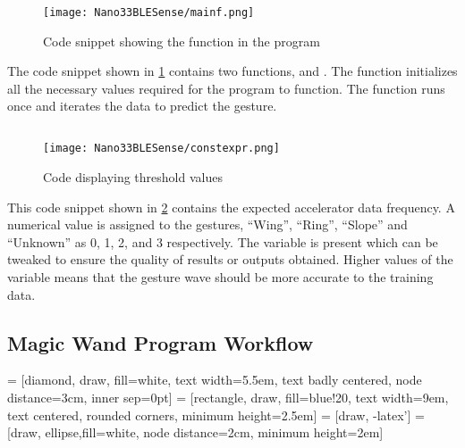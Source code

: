 \begin{figure}[h!]
    \texttt{[image: Nano33BLESense/mainf.png]}
    \caption{Code snippet showing the function  in the program}
    \label{mainf}
\end{figure}

The code snippet shown in \ref{mainf} contains two functions,  and . The function  initializes all the necessary values required for the program to function. The function   runs once and iterates the data to predict the gesture. 

\subsection{}


\begin{figure}[h!]
    \texttt{[image: Nano33BLESense/constexpr.png]}
    \caption{Code displaying threshold values}
    \label{constexpr}
\end{figure}

This code snippet shown in \ref{constexpr} contains the expected accelerator data frequency. A numerical value is assigned to the gestures, ``Wing'', ``Ring'', ``Slope'' and ``Unknown'' as 0, 1, 2, and 3 respectively. The variable  is present which can be tweaked to ensure the quality of results or outputs obtained. Higher values of the variable means that the gesture wave should be more accurate to the training data.


\subsection{Magic Wand Program Workflow}



 = [diamond, draw, fill=white, 
text width=5.5em, text badly centered, node distance=3cm, inner sep=0pt]
 = [rectangle, draw, fill=blue!20, 
text width=9em, text centered, rounded corners, minimum height=2.5em]
 = [draw, -latex']
 = [draw, ellipse,fill=white, node distance=2cm,
minimum height=2em]

